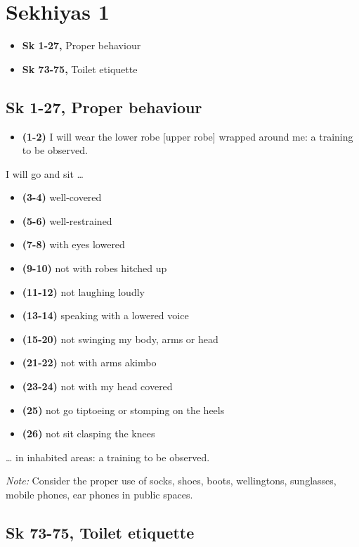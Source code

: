 \chapter{Sekhiyas 1}

\begin{itemize}
\tightlist
\item
  \textbf{Sk 1-27,} Proper behaviour
\item
  \textbf{Sk 73-75,} Toilet etiquette
\end{itemize}

\section{Sk 1-27, Proper behaviour}

\begin{itemize}
\tightlist
\item
  \textbf{(1-2)} I will wear the lower robe {[}upper robe{]} wrapped
  around me: a training to be observed.
\end{itemize}

I will go and sit \ldots{}

\begin{itemize}
\tightlist
\item
  \textbf{(3-4)} well-covered
\item
  \textbf{(5-6)} well-restrained
\item
  \textbf{(7-8)} with eyes lowered
\item
  \textbf{(9-10)} not with robes hitched up
\item
  \textbf{(11-12)} not laughing loudly
\item
  \textbf{(13-14)} speaking with a lowered voice
\item
  \textbf{(15-20)} not swinging my body, arms or head
\item
  \textbf{(21-22)} not with arms akimbo
\item
  \textbf{(23-24)} not with my head covered
\item
  \textbf{(25)} not go tiptoeing or stomping on the heels
\item
  \textbf{(26)} not sit clasping the knees
\end{itemize}

\ldots{} in inhabited areas: a training to be observed.

\emph{Note:} Consider the proper use of socks, shoes, boots,
wellingtons, sunglasses, mobile phones, ear phones in public spaces.

\section{Sk 73-75, Toilet etiquette}

